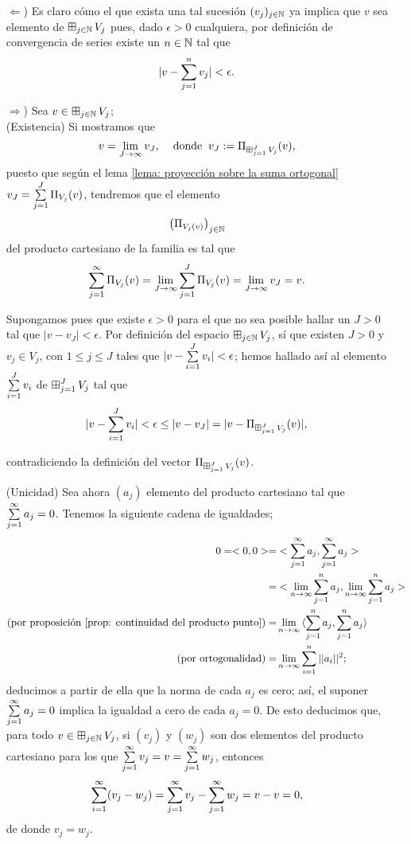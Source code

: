 \begin{itemize} 
\item[$\Leftarrow$)] Es claro cómo el que exista una tal
sucesión $(v_{j})_{j \in \mathbb{N}}$ ya implica que $v$ sea
elemento de $ \operatorname*{{\boxplus}}_{j \in \mathbb{N}} V_{j} $ pues,
dado $\epsilon >0$ cualquiera, por definición de convergencia 
de series existe un $n \in \mathbb{N}$ tal que
\[
| v - \sum\limits_{j=1}^{n}v_{j} | < \epsilon . 
\]
\item[$\Rightarrow$)]  Sea $v \in \operatorname*{{\boxplus}}_{j \in \mathbb{N}} V_{j} $;\\
(Existencia)
Si mostramos que
\[
v = \lim\limits_{J \rightarrow \infty}{v_{J}}, \hspace{0.4cm}
\text{donde} \hspace{0.2cm} v_{J}:= \Pi_{\operatorname*{{\boxplus}}_{j =1}^{J} V_{j}}(v),
\]
puesto que según el lema \ref{lema: proyección sobre la suma ortogonal}
$v_{J}= \sum\limits_{j=1}^{J}\Pi_{V_{j}}(v)$,
tendremos que el elemento \[
\left( \Pi_{V_{j}(v)} \right)_{j \in \mathbb{N}}
\]
del producto cartesiano de la familia
es tal que
\[
\sum\limits_{j=1}^{\infty}\Pi_{V_{j}}(v)
= \lim_{J \rightarrow \infty} \sum\limits_{j=1}^{J}\Pi_{V_{j}}(v)
= \lim\limits_{J \rightarrow \infty}{v_{J}}=v.
\]


Supongamos pues que existe $\epsilon >0$
para el que no sea posible hallar un $J>0$ tal que
$| v - v_{J} | < \epsilon $. Por definición del espacio 
$\operatorname*{{\boxplus}}_{j \in \mathbb{N}} V_{j}$, sí que existen $J>0$
y $v_{j} \in V_{j}$, con $1 \leq j \leq J$ 
tales que $|v - \sum\limits_{i=1}^{J}v_{i}| < \epsilon $; hemos
hallado así al elemento $\sum\limits_{i=1}^{J}v_{i}$ de 
$\operatorname*{{\boxplus}}_{j =1}^{J} V_{j}$
tal que
\[
|v - \sum\limits_{i=1}^{J}v_{i} | < \epsilon \leq |v - v_{J}| 
= |v - \Pi_{\operatorname*{{\boxplus}}_{j =1}^{J} V_{j}}(v) |,
\]

contradiciendo la definición del vector 
$\Pi_{\operatorname*{{\boxplus}}_{j =1}^{J} V_{j}}(v)$.



(Unicidad) Sea ahora
$(a_{j})$ elemento del producto cartesiano tal que $\sum\limits_{j=1}^{\infty}a_{j}=0$.
Tenemos la siguiente cadena de igualdades;
\begin{align*}
0 = <0,0> = & < \sum\limits_{j=1}^{\infty}a_{j} , \sum\limits_{j=1}^{\infty}a_{j}  > \\
= & < \lim\limits_{n \rightarrow \infty}{\sum\limits_{j=1}^{n}a_{j}},
\lim\limits_{n \rightarrow \infty}{\sum\limits_{j=1}^{n}a_{j}}> \\
\text{(por proposición \ref{prop: continuidad del producto punto})}
= & \lim\limits_{n \rightarrow \infty}{ \langle \sum\limits_{j=1}^{n}a_{j}  ,
\sum\limits_{j=1}^{n}a_{j} \rangle }  \\
\text{(por ortogonalidad)}= & \lim\limits_{n \rightarrow \infty}{\sum\limits_{i=1}^{n}|| a_{i}||^{2}};
\end{align*}
deducimos a partir de ella que la norma de cada $a_{j}$ es cero;
así, el suponer $\sum\limits_{j=1}^{\infty}a_{j}=0$ implica la igualdad
a cero de cada
$a_{j}=0$.  De esto deducimos que, para todo 
$v \in \operatorname*{{\boxplus}}_{j \in \mathbb{N}} V_{j}$, si $(v_{j})$ y $(w_{j})$
son dos
elementos del producto cartesiano para los que
$\sum\limits_{j=1}^{\infty}v_{j}=v = \sum\limits_{j=1}^{\infty}w_{j}$,
entonces
\[
\sum\limits_{i=1}^{\infty}(v_{j}-w_{j})= 
\sum\limits_{j=1}^{\infty}v_{j} - \sum\limits_{j=1}^{\infty}w_{j} = v-v=0,
\]
de donde $v_{j}=w_{j}$. \\


\end{itemize}
